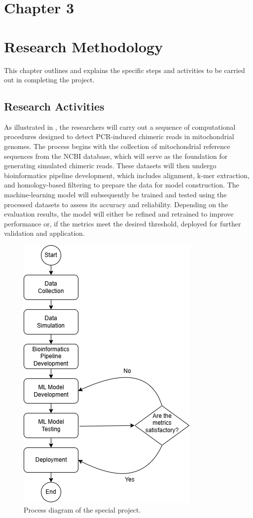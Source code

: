 \section*{Chapter 3}\label{sec:researchmethod}
\section{Research Methodology}

This chapter outlines and explains the specific steps and activities to be carried out in completing the project.

\subsection{Research Activities}

As illustrated in , the researchers will carry out a sequence of computational procedures designed to detect PCR-induced chimeric reads in mitochondrial genomes. The process begins with the collection of mitochondrial reference sequences from the NCBI database, which will serve as the foundation for generating simulated chimeric reads. These datasets will then undergo bioinformatics pipeline development, which includes alignment, k-mer extraction, and homology-based filtering to prepare the data for model construction. The machine-learning model will subsequently be trained and tested using the processed datasets to assess its accuracy and reliability. Depending on the evaluation results, the model will either be refined and retrained to improve performance or, if the metrics meet the desired threshold, deployed for further validation and application.

\begin{figure}[H]
  \centering
  \includegraphics[width=0.4\linewidth]{figures/research_activities.png}
  \caption{Process diagram of the special project.}\label{fig:process_diagram}
\end{figure}

